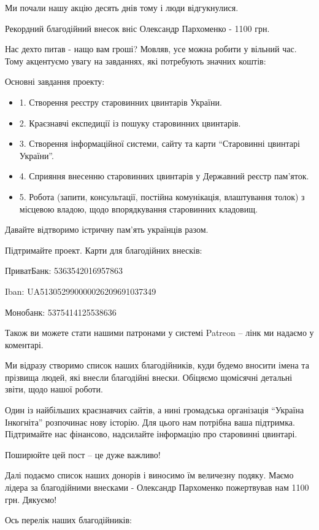 Ми почали нашу акцію десять днів тому і люди відгукнулися. 

Рекордний благодійний внесок вніс Олександр Пархоменко - 1100 грн. 

Нас дехто питав - нащо вам гроші? Мовляв, усе можна робити у вільний час. Тому
акцентуємо увагу на завданнях, які потребують значних коштів:

Основні завдання проекту:

\begin{itemize}
  \item 1. Створення реєстру старовинних цвинтарів України.
  \item 2. Краєзнавчі експедиції із пошуку старовинних цвинтарів.
  \item 3. Створення інформаційної системи, сайту та карти \enquote{Старовинні цвинтарі України}.
  \item 4. Сприяння внесенню старовинних цвинтарів у Державний реєстр пам’яток.
  \item 5. Робота (запити, консультації, постійна комунікація, влаштування
          толок) з місцевою владою, щодо впорядкування старовинних кладовищ.
\end{itemize}

Давайте відтворимо істричну пам’ять українців разом. 

Підтримайте проект.  Карти для благодійних внесків:

ПриватБанк: 5363542016957863

Iban: UA513052990000026209691037349

Монобанк: 5375414125538636

Також ви можете стати нашими патронами у системі Patreon – лінк ми надаємо у коментарі.

Ми відразу створимо список наших благодійників, куди будемо вносити імена та
прізвища людей, які внесли благодійні внески. Обіцяємо щомісячні детальні
звіти, щодо нашої роботи.

Один із найбільших краєзнавчих сайтів, а нині громадська організація “Україна
Інкогніта” розпочинає нову історію. Для цього нам потрібна ваша підтримка.
Підтримайте нас фінансово, надсилайте інформацію про старовинні цвинтарі. 

Поширюйте цей пост – це дуже важливо!

Далі подаємо список наших донорів і виносимо їм величезну подяку. Маємо лідера
за благодійними внесками - Олександр Пархоменко пожертвував нам 1100 грн.
Дякуємо!

Ось перелік наших благодійників:

